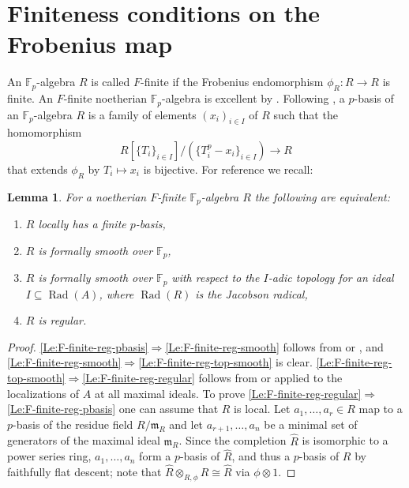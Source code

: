 \documentclass[a4paper,11pt]{article}
\theoremstyle{plain}
\newtheorem{Lemma}{Lemma}
\theoremstyle{definition}
\theoremstyle{remark}
\theoremstyle{definition}
\numberwithin{Lemma}{section}
\numberwithin{Subpoint}{Lemma}
\numberwithin{equation}{section}
\newcommand{\Fm}{\mathfrak{m}}
\newcommand{\FF}{{\mathbb{F}}}
\DeclareMathOperator{\Rad}{Rad}
\newcommand{\chang}[1]{{#1}}
\begin{document}
\section{Finiteness conditions on the Frobenius map}
\label{Se:Fin-Frob}

An $\FF_p$-algebra $R$ is called $F$-finite if 
the Frobenius endomorphism $\phi_R:R\to R$ is finite.
An $F$-finite noetherian $\FF_p$-algebra is excellent by 
\cite[Th.~2.5]{Kunz:Noetherian}.
\chang{Following \cite{Berthelot-Messing}, a $p$-basis of an $\FF_p$-algebra $R$ is a family of elements $(x_i)_{i\in I}$ of $R$ such that the homomorphism 
\begin{equation}
\label{Eq:p-basis}
R[\{T_i\}_{i\in I}]/(\{T_i^p-x_i\}_{i\in I})\to R
\end{equation}
that extends $\phi_R$ by $T_i\mapsto x_i$ is bijective.}
For reference we recall:

\begin{Lemma}
\label{Le:F-finite-reg}
For a noetherian $F$-finite\/ $\FF_p$-algebra $R$ the following are equivalent:
\begin{enumerate}
\item
\label{Le:F-finite-reg-pbasis}
\chang{$R$ locally has a finite $p$-basis,}
\item
\label{Le:F-finite-reg-smooth}
$R$ is formally smooth over $\FF_p$,
\item
\label{Le:F-finite-reg-top-smooth}
$R$ is formally smooth over $\FF_p$ with respect to the $I$-adic topology
for an ideal $I\subseteq\Rad(A)$,
where $\Rad(R)$ is the Jacobson radical,
\item
\label{Le:F-finite-reg-regular}
$R$ is regular.
\end{enumerate}
\end{Lemma}

\begin{proof}
\eqref{Le:F-finite-reg-pbasis}$\Rightarrow$\eqref{Le:F-finite-reg-smooth} 
follows from \cite[$0_{\,\rm IV}$ (21.2.7)]{EGA}
or \cite[Lemma 1.1.2]{Jong:Crystalline}, 
and \eqref{Le:F-finite-reg-smooth}$\Rightarrow$\eqref{Le:F-finite-reg-top-smooth} 
is clear.
\eqref{Le:F-finite-reg-top-smooth}$\Rightarrow$\eqref{Le:F-finite-reg-regular}
follows from \cite[$0_{\,\rm IV}$ (22.5.8)]{EGA} or \cite[Thm.~28.7]{Matsumura:Ring}
applied to the localizations of $A$ at all maximal ideals.
To prove \eqref{Le:F-finite-reg-regular}$\Rightarrow$\eqref{Le:F-finite-reg-pbasis}
one can assume that $R$ is local.
Let $a_1,\ldots,a_r\in R$ map to a $p$-basis of the residue field $R/\Fm_R$
and let $a_{r+1},\ldots,a_n$ be a minimal set of generators of the maximal
ideal $\Fm_R$. 
Since the completion $\hat R$ is isomorphic to a power series ring,
$a_1,\ldots,a_n$ form a $p$-basis of $\hat R$, 
and thus a $p$-basis of $R$ by faithfully flat descent;
note that $\hat R\otimes_{R,\phi}R\cong\hat R$ via $\phi\otimes 1$.
\end{proof}
\end{document}
